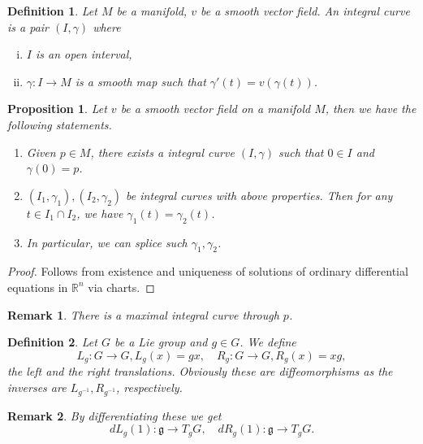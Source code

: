 \documentclass{article}
\newtheorem{proposition}{Proposition}[section]
\newtheorem{definition}{Definition}[section]
\newtheorem{remark}{Remark}[section]
\numberwithin{equation}{section}
\begin{document}
\begin{definition}
Let $M$ be a manifold, $v$ be a smooth vector field. An integral curve is a pair $(I,\gamma)$ where
\begin{enumerate}[i).]
\item $I$ is an open interval,
\item $\gamma:I\to M$ is a smooth map such that $\gamma'(t) = v(\gamma(t))$.
\end{enumerate}
\end{definition}

\begin{proposition} 
Let $v$ be a smooth vector field on a manifold $M$, then we have the following statements.
\begin{enumerate}[1).]
\item Given $p\in M$, there exists a integral curve $(I,\gamma)$ such that $0\in I$ and $\gamma(0)=p$. 
\item $(I_1,\gamma_1),(I_2,\gamma_2)$ be integral curves with above properties. Then for any $t\in I_1\cap I_2$, we have $\gamma_1(t)=\gamma_2(t)$. 
\item In particular, we can splice such $\gamma_1,\gamma_2$. 
\end{enumerate}
\label{existence_integral_curve}
\end{proposition}

\begin{proof}
Follows from existence and uniqueness of solutions of ordinary differential equations in $\mathbb{R}^n$ via charts.%
\end{proof}

\begin{remark}
There is a maximal integral curve through $p$.
\end{remark}

\begin{definition}
Let $G$ be a Lie group and $g\in G$. We define
\begin{equation*}
L_g:G\to G, L_g(x) = gx,\quad R_g:G\to G, R_g(x)=xg,
\end{equation*}
the left and the right translations. Obviously these are diffeomorphisms as the inverses are $L_{g^{-1}}, R_{g^{-1}}$, respectively.
\end{definition}

\begin{remark}
By differentiating these we get
\begin{equation*}
dL_g(1):\mathfrak{g}\to T_gG,\quad dR_g(1):\mathfrak{g}\to T_gG.
\end{equation*}
\end{remark}
\end{document}
